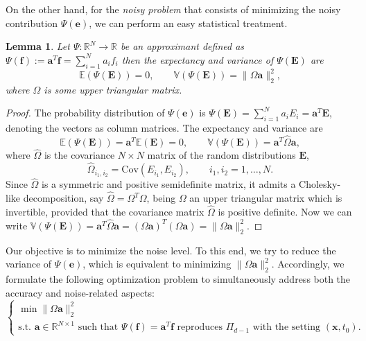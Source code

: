 \documentclass[preprint]{elsarticle}       %
\newcommand{\R}{\mathds{R}}
\newcommand{\lra}{\longrightarrow}
\newcommand{\ba}{\bm{a}}
\newcommand{\bE}{\bm{E}}
\newcommand{\be}{\bm{e}}
\newcommand{\bff}{\bm{f}}
\newcommand{\bx}{\bm{x}}
\newcommand{\var}[1]{\mathbb{V}\left(#1\right)}
\newcommand{\mean}[1]{\mathbb{E}\left(#1\right)}
\theoremstyle{plain}
\newtheorem{lem}[thm]{Lemma}
\theoremstyle{remark}
\begin{document}
On the other hand, for the \emph{noisy problem} that consists of minimizing the noisy contribution $\Psi (\be)$, we can perform an easy statistical treatment.

\begin{lem}
	Let $\Psi:\R^N\lra\R$ be an approximant defined as $\Psi(\bff) := \ba^T\bff=  \sum_{i=1}^{N} a_i f_{i}$ then
	the expectancy and variance of $\Psi(\bE)$ are
	\begin{equation} \label{eq:error_variance}
		\mean{\Psi(\bE)} = 0, \qquad \var{\Psi(\bE)} = \| \Omega \ba\|_2^2,
	\end{equation}
	where $\Omega$ is some upper triangular matrix.
\end{lem}
\begin{proof}
	The probability distribution of $\Psi (\be)$ is $ \Psi(\bE) = \sum_{i=1}^{N} a_i E_{i} = \ba^T \bE$, denoting the vectors as column matrices. The expectancy and variance are
	$$ \mean{\Psi(\bE)} = \ba^T \mean{\bE} = 0, \qquad \var{\Psi(\bE)} = \ba^T \hat \Omega \ba,$$
	where
	$\hat \Omega$ is the covariance $N\times N$ matrix of the random distributions $\bE$,
	$$ \hat \Omega_{i_1,i_2} = \text{Cov}(E_{i_1},E_{i_2}), \qquad i_1,i_2 = 1,\ldots, N.$$
	Since $\hat \Omega$ is a symmetric and positive semidefinite matrix, it admits a Cholesky-like decomposition, say $ \hat \Omega = \Omega^T \Omega$,
	being $\Omega$ an upper triangular matrix which is invertible, provided that the covariance matrix $\hat \Omega$ is positive definite.
	Now we can write
	$ \var{\Psi(\bE)} = \ba^T \hat \Omega \ba = (\Omega \ba)^T (\Omega \ba) = \| \Omega \ba\|_2^2.$
\end{proof}

Our objective is to minimize the noise level. To this end, we try to reduce the variance of $\Psi (\be)$,  which is equivalent to minimizing  $\|\Omega \ba\|_2^2$.
Accordingly, we formulate the following optimization problem to simultaneously address both the accuracy and noise-related aspects:
\begin{equation} \label{eq:constrained_optimization}
	\begin{cases}
		\min \|\Omega \ba\|_2^2\\
		\text{s.t. $\ba\in\R^{N\times 1}$ such that $\Psi(\bff) = \ba^T \bff$ reproduces $\Pi_{d-1}$ with the setting $(\bx, t_0)$.}
	\end{cases}
\end{equation}
\end{document}
